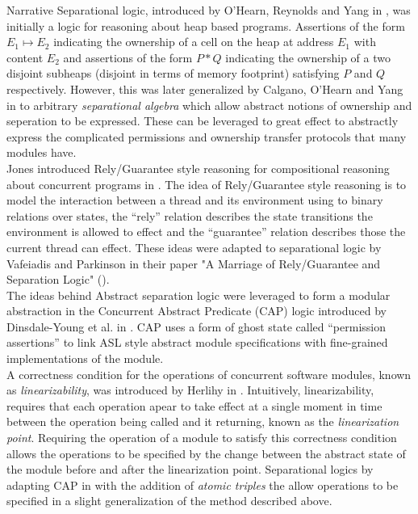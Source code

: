 \documentclass{article}
\begin{document}
\begin{section}{Narrative}
  Separational logic, introduced by O'Hearn, Reynolds and Yang in \cite{SL}, was initially a logic for reasoning about heap based programs. Assertions of the form $E_1 \mapsto E_2$ indicating the ownership of a cell on the heap at address $E_1$ with content $E_2$ and assertions of the form $P * Q$ indicating the ownership of a two disjoint subheaps (disjoint in terms of memory footprint) satisfying $P$ and $Q$ respectively. However, this was later generalized by Calgano, O'Hearn and Yang in \cite{ASL} to arbitrary \emph{separational algebra} which allow abstract notions of ownership and seperation to be expressed. These can be leveraged to great effect to abstractly express the complicated permissions and ownership transfer protocols that many modules have.\\

  Jones introduced Rely/Guarantee style reasoning for compositional reasoning about concurrent programs in \cite{RGReasoning}. The idea of Rely/Guarantee style reasoning is to model the interaction between a thread and its environment using to binary relations over states, the ``rely'' relation describes the state transitions the environment is allowed to effect and the ``guarantee'' relation describes those the current thread can effect.  These ideas were adapted to separational logic by Vafeiadis and Parkinson in their paper "A Marriage of Rely/Guarantee and Separation Logic" (\cite{RGSEP}). \\

  The ideas behind Abstract separation logic were leveraged to form a modular abstraction in the Concurrent Abstract Predicate (CAP) logic introduced by Dinsdale-Young et al. in \cite{CAP}. CAP uses a form of ghost state called ``permission assertions'' to link ASL style abstract module specifications with fine-grained implementations of the module.\\
  
  A correctness condition for the operations of concurrent software modules, known as \emph{linearizability}, was introduced by Herlihy in \cite{Linearizability}. Intuitively, linearizability, requires that each operation apear to take effect at a single moment in time between the operation being called and it returning, known as the \emph{linearization point}. Requiring the operation of a module to satisfy this correctness condition allows the operations to be specified by the change between the abstract state of the module before and after the linearization point. Separational logics by adapting CAP in \cite{TaDA} with the addition of \emph{atomic triples} the allow operations to be specified in a slight generalization of the method described above. \\


\end{section}
\end{document}
